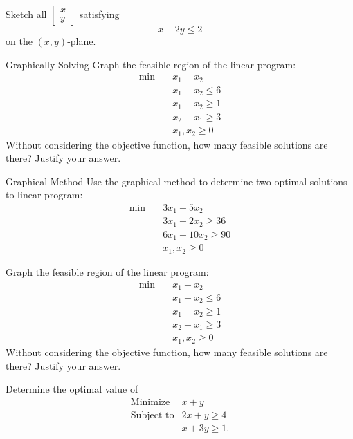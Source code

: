 \begin{ex} \label{ex:feasible-region}
Sketch all \(\begin{bmatrix} x \\ y \end{bmatrix}\) satisfying
\[
x - 2y \leq 2
\]
on the \((x,y)\)-plane.
\end{ex}

\begin{ex}{Graphically Solving}{}
Graph the feasible region of the linear program:
\begin{align*}
\min  \quad & x_1 - x_2\\
 & x_1 + x_2 \leq 6\\
 & x_1 - x_2 \geq 1\\
 & x_2 - x_1 \geq 3\\ 
 & x_1, x_2 \geq 0
\end{align*}
Without considering the objective function, how many feasible solutions are there?  Justify your answer.
\end{ex}


\begin{ex}{Graphical Method}{}
Use the graphical method to determine two optimal solutions to linear program:
\begin{align*}
\min  \quad& 3x_1 + 5x_2\\
 & 3x_1 + 2x_2 \ge 36\\
 & 6x_1 + 10x_2 \geq 90\\
 & x_1, x_2 \geq 0
\end{align*}
\end{ex}


\begin{ex}{}
\label{ex:infeasible}
Graph the feasible region of the linear program:
\begin{align*}
\min  \quad & x_1 - x_2\\
 & x_1 + x_2 \leq 6\\
 & x_1 - x_2 \geq 1\\
 & x_2 - x_1 \geq 3\\ 
 & x_1, x_2 \geq 0
\end{align*}
Without considering the objective function, how many feasible solutions are there?  Justify your answer.
\end{ex}





\begin{ex} \label{ex:lp-optimal-value}
Determine the optimal value of
\[
\begin{array}{rl}
\text{Minimize} & x + y \\
\text{Subject to} &  2x + y \geq 4 \\
& x + 3y \geq 1.
\end{array}
\]
\end{ex}

